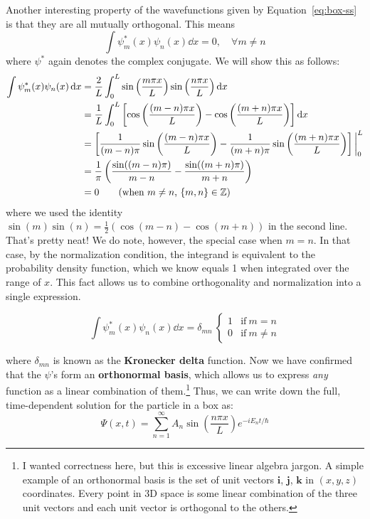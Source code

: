 Another interesting property of the wavefunctions given by Equation~\ref{eq:box-ss} is that they are all mutually orthogonal. This means 
\begin{equation*}
	\int \psi_m^*(x) \psi_n(x) \dd{x} = 0, \quad \forall m \neq n
\end{equation*}
where $\psi^*$ again denotes the complex conjugate. We will show this as follows:
\begin{align*}
	\int \psi_m^*(x) \psi_n(x) \dd{x} &= \frac{2}{L} \int_0^L \sin\left(\frac{m\pi x}{L}\right) \sin\left(\frac{n\pi x}{L} \right) \dd{x} \\
	&= \frac{1}{L} \int_{0}^{L} \left[ \cos\left(\frac{(m-n)\pi x}{L}\right) - \cos\left(\frac{(m+n)\pi x}{L}\right) \right] \dd{x} \\
	&= \left[ \frac{1}{(m-n)\pi} \sin \left(\frac{(m-n)\pi x}{L}\right) - \frac{1}{(m+n)\pi} \sin\left( \frac{(m+n)\pi x}{L} \right)\right] \bigg|_0^L \\
	&= \frac{1}{\pi} \left( \frac{\sin((m-n)\pi)}{m-n} - \frac{\sin((m+n)\pi)}{m+n}\right) \\
	&= 0 \tag{when $m\neq n$, $\{m,n\} \in \mathbb{Z}$}
\end{align*}
where we used the identity $\sin(m)\sin(n) = \frac{1}{2}(\cos(m-n) - \cos(m+n))$ in the second line. That's pretty neat! We do note, however, the special case when $m=n$. In that case, by the normalization condition, the integrand is equivalent to the probability density function, which we know equals 1 when integrated over the range of $x$. This fact allows us to combine orthogonality and normalization into a single expression.
\begin{tcolorbox}[title = Orthonormal stationary states] \vspace{-2ex}
	\begin{equation}
		\int \psi_m^*(x) \psi_n(x) \dd{x} = \delta_{mn}\ \begin{cases}
		1 & \text{if}\ m=n \\
		0 & \text{if}\ m\neq n
		\end{cases} \label{eq:orthonorm}
	\end{equation}
\end{tcolorbox}
where $\delta_{mn}$ is known as the \textbf{Kronecker delta} function. Now we have confirmed that the $\psi$'s form an \textbf{orthonormal basis}, which allows us to express \emph{any} function as a linear combination of them.\footnote{I wanted correctness here, but this is excessive linear algebra jargon. A simple example of an orthonormal basis is the set of unit vectors $\mathbf{i}$, $\mathbf{j}$, $\mathbf{k}$ in $(x,y,z)$ coordinates. Every point in 3D space is some linear combination of the three unit vectors and each unit vector is orthogonal to the others.} Thus, we can write down the full, time-dependent solution for the particle in a box as:
\begin{equation}
	\Psi(x,t) = \sum_{n=1}^{\infty} A_n \sin \left(\frac{n\pi x}{L}\right) e^{-iE_nt/\hbar} \label{eq:tdwf-box}
\end{equation}

